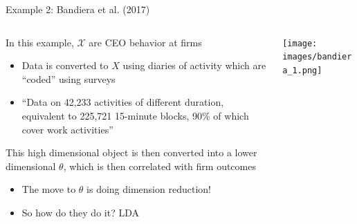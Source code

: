 \documentclass[notes,11pt, aspectratio=169]{beamer}
\newenvironment{wideitemize}{\itemize\addtolength{\itemsep}{10pt}}{\enditemize}
\begin{document}
\begin{frame}{Example 2: Bandiera et al. (2017)}
    \begin{columns}[onlytextwidth, T] %
      \begin{column}{.5\textwidth}
        \begin{wideitemize}
        \item In this example, $\mathcal{X}$ are CEO behavior at firms
          \begin{itemize}
          \item Data is converted to $X$ using diaries of activity
            which are ``coded'' using surveys
          \item ``Data on 42,233 activities of different duration,
            equivalent to 225,721 15-minute blocks, 90\% of which
            cover work activities''
          \end{itemize}
        \item This high dimensional object is then converted into a lower dimensional $\theta$, which is then correlated with firm outcomes
          \begin{itemize}
          \item The move to $\theta$ is doing dimension reduction!
          \item So how do they do it? LDA
          \end{itemize}
        \end{wideitemize}
      \end{column}%
      \hfill%
      \begin{column}{.5\textwidth}
        \texttt{[image: images/bandiera\_1.png]}
      \end{column}%
    \end{columns}
  \end{frame}
\end{document}
